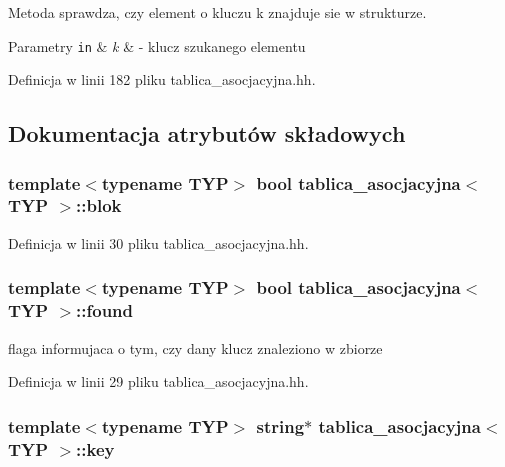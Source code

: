 Metoda sprawdza, czy element o kluczu k znajduje sie w strukturze. 


\begin{DoxyParams}[1]{Parametry}
\mbox{\tt in}  & {\em k} & -\/ klucz szukanego elementu \\
\hline
\end{DoxyParams}


Definicja w linii 182 pliku tablica\-\_\-asocjacyjna.\-hh.



\subsection{Dokumentacja atrybutów składowych}
\hypertarget{classtablica__asocjacyjna_a384365c022138ea28ce079e0173e00ab}{
\subsubsection[{blok}]{\setlength{\rightskip}{0pt plus 5cm}template$<$typename T\-Y\-P$>$ bool {\bf tablica\-\_\-asocjacyjna}$<$ T\-Y\-P $>$\-::blok\hspace{0.3cm}{\ttfamily [private]}}}\label{classtablica__asocjacyjna_a384365c022138ea28ce079e0173e00ab}


Definicja w linii 30 pliku tablica\-\_\-asocjacyjna.\-hh.

\hypertarget{classtablica__asocjacyjna_aa3423d398d1a6b96e3f42398a2ce5a1e}{
\subsubsection[{found}]{\setlength{\rightskip}{0pt plus 5cm}template$<$typename T\-Y\-P$>$ bool {\bf tablica\-\_\-asocjacyjna}$<$ T\-Y\-P $>$\-::found\hspace{0.3cm}{\ttfamily [private]}}}\label{classtablica__asocjacyjna_aa3423d398d1a6b96e3f42398a2ce5a1e}


flaga informujaca o tym, czy dany klucz znaleziono w zbiorze 



Definicja w linii 29 pliku tablica\-\_\-asocjacyjna.\-hh.

\hypertarget{classtablica__asocjacyjna_aefde9ad3347d42f36cab258144bacc1f}{
\subsubsection[{key}]{\setlength{\rightskip}{0pt plus 5cm}template$<$typename T\-Y\-P$>$ string$\ast$ {\bf tablica\-\_\-asocjacyjna}$<$ T\-Y\-P $>$\-::key\hspace{0.3cm}{\ttfamily [private]}}}\label{classtablica__asocjacyjna_aefde9ad3347d42f36cab258144bacc1f}


